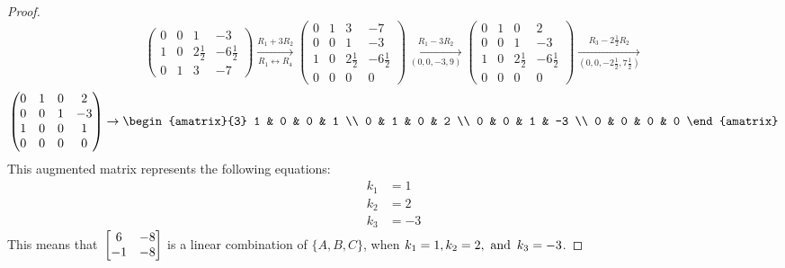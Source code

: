 \begin{enumerate}
\begin{proof}
\[\begin{pmatrix}
        0 & 0 & 1            & -3            \\
        1 & 0 & 2\frac{1}{2} & -6\frac{1}{2} \\
        0 & 1 & 3            & -7
      \end{pmatrix} \xrightarrow[R_1 \leftrightarrow R_4]{R_1 + 3R_2}
      \begin{pmatrix}
        0 & 1 & 3            & -7            \\
        0 & 0 & 1            & -3            \\
        1 & 0 & 2\frac{1}{2} & -6\frac{1}{2} \\
        0 & 0 & 0            & 0
      \end{pmatrix} \xrightarrow[(0,0,-3,9)]{R_1 - 3R_2}
      \begin{pmatrix}
        0 & 1 & 0            & 2             \\
        0 & 0 & 1            & -3            \\
        1 & 0 & 2\frac{1}{2} & -6\frac{1}{2} \\
        0 & 0 & 0            & 0
      \end{pmatrix} \xrightarrow[(0,0,-2\frac{1}{2}, 7\frac{1}{2})]{R_3 - 2\frac{1}{2}R_2}
    \]
    \[
      \begin{pmatrix}
        0 & 1 & 0 & 2  \\
        0 & 0 & 1 & -3 \\
        1 & 0 & 0 & 1  \\
        0 & 0 & 0 & 0
      \end{pmatrix} \rightarrow
      \begin{amatrix}{3}
        1 & 0 & 0 & 1  \\
        0 & 1 & 0 & 2  \\
        0 & 0 & 1 & -3 \\
        0 & 0 & 0 & 0
      \end{amatrix}
    \]
    This augmented matrix represents the following equations:
    \begin{align*}
      k_1 & = 1  \\
      k_2 & = 2  \\
      k_3 & = -3
    \end{align*}
    This means that $\operatorname{\displaystyle} \begin{bmatrix} 6 & -8 \\ -1 & -8 \end{bmatrix}$ is a linear combination of $\{A,B,C\}$, when $k_1 = 1, k_2 = 2, \operatorname{~\text{and}~} k_3 = -3$.
  \end{proof}

\end{enumerate}
